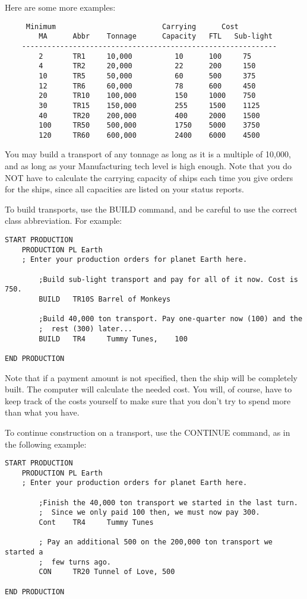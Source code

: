 \documentclass[10pt,titlepage]{article}
\begin{document}
Here are some more examples:
\begin{verbatim}
     Minimum                         Carrying      Cost
        MA      Abbr    Tonnage      Capacity   FTL   Sub-light
    ------------------------------------------------------------
        2       TR1     10,000          10      100     75
        4       TR2     20,000          22      200     150
        10      TR5     50,000          60      500     375
        12      TR6     60,000          78      600     450
        20      TR10    100,000         150     1000    750
        30      TR15    150,000         255     1500    1125
        40      TR20    200,000         400     2000    1500
        100     TR50    500,000         1750    5000    3750
        120     TR60    600,000         2400    6000    4500
\end{verbatim}

You may build a transport of any tonnage as long as it is a multiple of 10,000,
and as long as your Manufacturing tech level is high enough.  Note that you do
NOT have to calculate the carrying capacity of ships each time you give orders
for the ships, since all capacities are listed on your status reports.

To build transports, use the BUILD command, and be careful to use the correct
class abbreviation.  For example:
\begin{verbatim}
START PRODUCTION
    PRODUCTION PL Earth
    ; Enter your production orders for planet Earth here.

        ;Build sub-light transport and pay for all of it now. Cost is 750.
        BUILD   TR10S Barrel of Monkeys

        ;Build 40,000 ton transport. Pay one-quarter now (100) and the
        ;  rest (300) later...
        BUILD   TR4     Tummy Tunes,    100

END PRODUCTION
\end{verbatim}

Note that if a payment amount is not specified, then the ship will be
completely built.  The computer will calculate the needed cost.  You will, of
course, have to keep track of the costs yourself to make sure that you don't
try to spend more than what you have.

To continue construction on a transport, use the CONTINUE command, as in the
following example:

\begin{verbatim}
START PRODUCTION
    PRODUCTION PL Earth
    ; Enter your production orders for planet Earth here.

        ;Finish the 40,000 ton transport we started in the last turn.
        ;  Since we only paid 100 then, we must now pay 300.
        Cont    TR4     Tummy Tunes

        ; Pay an additional 500 on the 200,000 ton transport we started a
        ;  few turns ago.
        CON     TR20 Tunnel of Love, 500

END PRODUCTION

\end{verbatim}
\end{document}
